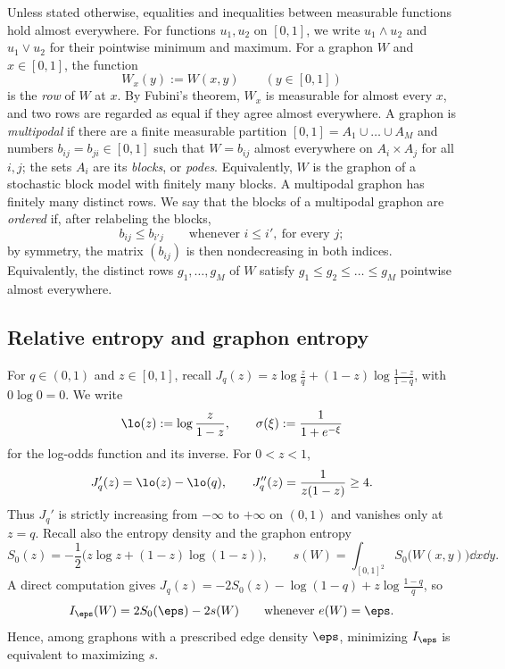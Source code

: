 Unless stated otherwise, equalities and inequalities between measurable
functions hold almost everywhere.  For functions $u_1,u_2$ on $[0,1]$, we write
$u_1\wedge u_2$ and $u_1\vee u_2$ for their pointwise minimum and maximum.  For a graphon $W$ and $x\in[0,1]$, the
function
\[
  W_x(y):=W(x,y)\qquad(y\in[0,1])
\]
is the \emph{row} of $W$ at $x$.  By Fubini's theorem, $W_x$ is measurable for
almost every $x$, and two rows are regarded as equal if they agree almost
everywhere.  A graphon is \emph{multipodal} if there are a finite measurable
partition $[0,1]=A_1\cup\dots\cup A_M$ and numbers $b_{ij}=b_{ji}\in[0,1]$ such
that $W=b_{ij}$ almost everywhere on $A_i\times A_j$ for all $i,j$; the sets
$A_i$ are its \emph{blocks}, or \emph{podes}.  Equivalently, $W$ is the
graphon of a stochastic block model with finitely many blocks.  A multipodal
graphon has finitely many distinct rows.  We say that the blocks of a
multipodal graphon are \emph{ordered} if, after relabeling the blocks,
\begin{equation}\label{eq:ordered-blocks}
  b_{ij}\le b_{i'j}\qquad\text{whenever }i\le i',\ \text{for every }j;
\end{equation}
by symmetry, the matrix $(b_{ij})$ is then nondecreasing in both indices.
Equivalently, the distinct rows $g_1,\dots,g_M$ of $W$ satisfy
$g_1\le g_2\le\dots\le g_M$ pointwise almost everywhere.

\subsection{Relative entropy and graphon entropy}

For $q\in(0,1)$ and $z\in[0,1]$, recall
$J_q(z)=z\log\frac zq+(1-z)\log\frac{1-z}{1-q}$, with $0\log0=0$.  We write
\[
  \lo(z):=\log\frac z{1-z},
  \qquad
  \sigma(\xi):=\frac1{1+e^{-\xi}}
\]
for the log-odds function and its inverse.  For $0<z<1$,
\[
  J_q'(z)=\lo(z)-\lo(q),
  \qquad
  J_q''(z)=\frac1{z(1-z)}\ge4.
\]
Thus $J_q'$ is strictly increasing from $-\infty$ to $+\infty$ on $(0,1)$ and
vanishes only at $z=q$.  Recall also the entropy density and the graphon
entropy
\[
  S_0(z)=-\frac12\bigl(z\log z+(1-z)\log(1-z)\bigr),
  \qquad
  s(W)=\int_{[0,1]^2}S_0\bigl(W(x,y)\bigr)\dd x\dd y.
\]
A direct computation gives $J_q(z)=-2S_0(z)-\log(1-q)+z\log\frac{1-q}q$, so
\begin{equation}\label{eq:entropy-identity}
  I_\eps(W)=2S_0(\eps)-2s(W)\qquad\text{whenever }e(W)=\eps.
\end{equation}
Hence, among graphons with a prescribed edge density $\eps$, minimizing
$I_\eps$ is equivalent to maximizing $s$.

